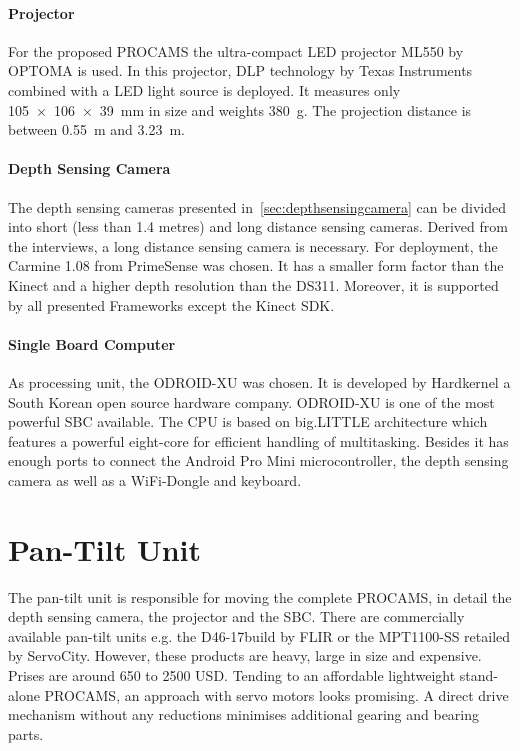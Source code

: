 \paragraph{Projector}
For the proposed PROCAMS the ultra-compact LED projector ML550 by OPTOMA is used. In this projector, DLP technology by Texas Instruments combined with a LED light source is deployed. It measures only \SI{105 x 106 x 39}{\mm} in size and weights \SI{380}{\g}. The projection distance is between \SI{0.55}{\meter} and \SI{3.23}{\meter}.

\paragraph{Depth Sensing Camera}
The depth sensing cameras presented in~\autoref{sec:depthsensingcamera} can be divided into short (less than 1.4 metres) and long distance sensing cameras. Derived from the interviews, a long distance sensing camera is necessary. For deployment, the Carmine 1.08 from PrimeSense was chosen. It has a smaller form factor than the Kinect and a higher depth resolution than the DS311. Moreover, it is supported by all presented Frameworks except the Kinect SDK.  

\paragraph{Single Board Computer}
As processing unit, the ODROID-XU was chosen. It is developed by Hardkernel a South Korean open source hardware company. ODROID-XU is one of the most powerful SBC available. The CPU is based on big.LITTLE architecture which features a powerful eight-core for efficient handling of multitasking. Besides it has enough ports to connect the Android Pro Mini microcontroller, the depth sensing camera as well as a WiFi-Dongle and keyboard. 


\section{Pan-Tilt Unit}
The pan-tilt unit is responsible for moving the complete PROCAMS, in detail the depth sensing camera, the projector and the SBC. 
There are commercially available pan-tilt units e.g. the D46-17build by FLIR or the MPT1100-SS retailed by ServoCity. However, these products are heavy, large in size and expensive. Prises are around 650 to 2500 USD. Tending to an affordable lightweight stand-alone \ac{PROCAMS}, an approach with servo motors looks promising. A direct drive mechanism without any reductions minimises additional gearing and bearing parts.


